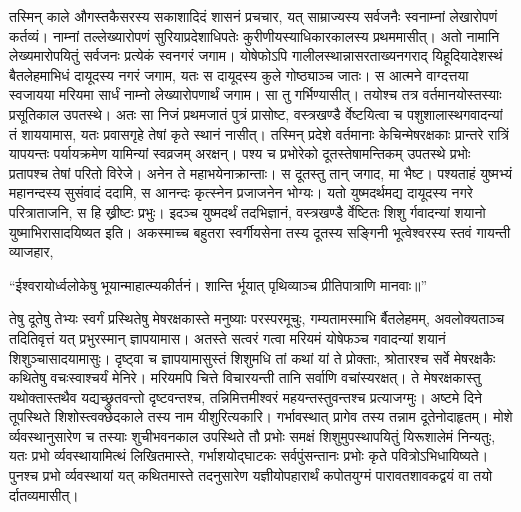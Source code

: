 \adhyAya
{}
\vakya तस्मिन् काले औगस्तकैसरस्य सकाशादिदं शासनं प्रचचार, यत् साम्राज्यस्य सर्वजनैः स्वनाम्नां लेखारोपणं कर्तव्यं।
\vakya नाम्नां तल्लेख्यारोपणं सुरियाप्रदेशाधिपतेः कुरीणीयस्याधिकारकालस्य प्रथममासीत्।
\vakya अतो नामानि लेख्यमारोपयितुं सर्वजनः प्रत्येकं स्वनगरं जगाम।
\vakya योषेफोऽपि गालीलस्थान्नासरताख्यनगराद् यिहूदियादेशस्थं बैतलेहमाभिधं दायूदस्य नगरं जगाम, यतः स दायूदस्य कुले गोष्ठ्याञ्च जातः।
\vakya स आत्मने वाग्दत्तया स्वजायया मरियमा सार्धं नाम्नो लेख्यारोपणार्थं जगाम। सा तु गर्भिण्यासीत्।
\vakya तयोश्च तत्र वर्तमानयोस्तस्याः प्रसूतिकाल उपतस्थे।
\vakya अतः सा निजं प्रथमजातं पुत्रं प्रासोष्ट, वस्त्रखण्डै र्वेष्टयित्वा च पशुशालास्थगवादन्यां तं शाययामास, यतः प्रवासगृहे तेषां कृते स्थानं नासीत्।
\vakya तस्मिन् प्रदेशे वर्तमानाः केचिन्मेषरक्षकाः प्रान्तरे रात्रिं यापयन्तः पर्यायक्रमेण यामिन्यां स्वव्रजम् अरक्षन्।
\vakya पश्य च प्रभोरेको दूतस्तेषामन्तिकम् उपतस्थे प्रभोः प्रतापश्च तेषां परितो विरेजे। अनेन ते महाभयेनाक्रान्ताः।
\vakya स दूतस्तु तान् जगाद, मा भैष्ट। पश्यताहं युष्मभ्यं महानन्दस्य सुसंवादं ददामि, स आनन्दः कृत्स्नेन प्रजाजनेन भोग्यः।
\vakya यतो युष्मदर्थमद्य दायूदस्य नगरे परित्राताजनि, स हि ख्रीष्टः प्रभुः।
\vakya इदञ्च युष्मदर्थं तदभिज्ञानं, वस्त्रखण्डै र्वेष्टितः शिशु र्गवादन्यां शयानो युष्माभिरासादयिष्यत इति।
\vakya अकस्माच्च बहुतरा स्वर्गीयसेना तस्य दूतस्य सङ्गिनी भूत्वेश्वरस्य स्तवं गायन्ती व्याजहार,
\begin{poem}
\startwithvakya “ईश्वरायोर्ध्वलोकेषु भूयान्माहात्म्यकीर्तनं।
\pline शान्ति र्भूयात् पृथिव्याञ्च प्रीतिपात्राणि मानवाः॥”
\end{poem}
\vakya तेषु दूतेषु तेभ्यः स्वर्गं प्रस्थितेषु मेषरक्षकास्ते मनुष्याः परस्परमूचुः, गम्यतामस्माभि र्बैतलेहमम्, अवलोक्यताञ्च तदितिवृत्तं यत् प्रभुरस्मान् ज्ञापयामास।
\vakya अतस्ते सत्वरं गत्वा मरियमं योषेफञ्च गवादन्यां शयानं शिशुञ्चासादयामासुः।
\vakya दृष्ट्वा च ज्ञापयामासुस्तं शिशुमधि तां कथां यां ते प्रोक्ताः,
\vakya श्रोतारश्च सर्वे मेषरक्षकैः कथितेषु वचःस्वाश्चर्यं मेनिरे।
\vakya मरियमपि चित्ते विचारयन्ती तानि सर्वाणि वचांस्यरक्षत्।
\vakya ते मेषरक्षकास्तु यथोक्तास्तथैव यद्यच्छ्रुतवन्तो दृष्टवन्तश्च, तन्निमित्तमीश्वरं महयन्तस्तुवन्तश्च प्रत्याजग्मुः।
\vakya अष्टमे दिने तूपस्थिते शिशोस्त्वक्छेदकाले तस्य नाम यीशुरित्यकारि। गर्भावस्थात् प्रागेव तस्य तन्नाम दूतेनोदाहृतम्।
\vakya मोशे र्व्यवस्थानुसारेण च तस्याः शुचीभवनकाल उपस्थिते तौ प्रभोः समक्षं शिशुमुपस्थापयितुं यिरूशालेमं निन्यतुः,
\vakya यतः प्रभो र्व्यवस्थायामित्थं लिखितमास्ते, गर्भाशयोद्घाटकः सर्वपुंसन्तानः प्रभोः कृते पवित्रोऽभिधायिष्यते।
\vakya पुनश्च प्रभो र्व्यवस्थायां यत् कथितमास्ते तदनुसारेण यज्ञीयोपहारार्थं कपोतयुग्मं पारावतशावकद्वयं वा तयो र्दातव्यमासीत्।
